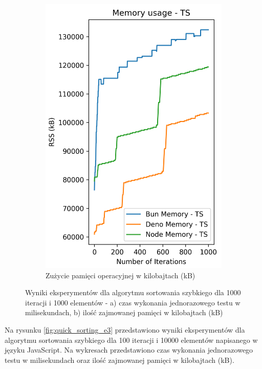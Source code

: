 \begin{figure}[H]
\begin{subfigure}[b]{0.42\textwidth}
    \label{fig:quick_sorting_e2_ts_time}
  \end{subfigure}
  \begin{subfigure}[b]{0.42\textwidth}
    \centering
    \includegraphics[width=\textwidth]{Figures/sorting/sorting_quick_1000_1000_ts_memory.png}
    \caption{Zużycie pamięci operacyjnej w kilobajtach (kB)}
    \label{fig:quick_sorting_e2_ts_memory}
  \end{subfigure}
  \caption{Wyniki eksperymentów dla algorytmu sortowania szybkiego dla 1000 iteracji i 1000 elementów - a) czas wykonania jednorazowego testu w milisekundach, b) ilość zajmowanej pamięci w kilobajtach (kB)}
  \label{fig:quick_sorting_e2_ts}
\end{figure}

Na rysunku \ref{fig:quick_sorting_e3} przedstawiono wyniki eksperymentów dla algorytmu sortowania szybkiego dla 100 iteracji i 10000 elementów napisanego w języku JavaScript. Na wykresach przedstawiono czas wykonania jednorazowego testu w milisekundach oraz ilość zajmowanej pamięci w kilobajtach (kB).

